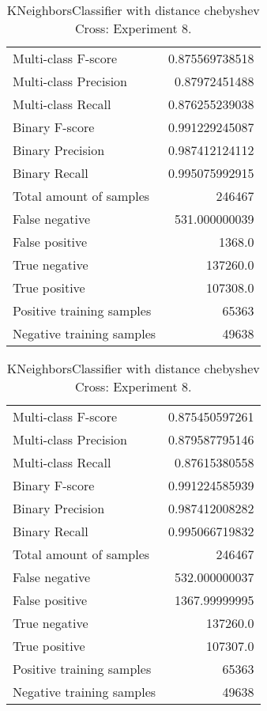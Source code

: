 \begin{table}[H]
\begin{minipage}{0.5\textwidth}
\caption{KNeighborsClassifier with distance chebyshev Cross: Experiment 7.}
\centering
\begin{tabular}{l r}
\toprule
Multi-class F-score & 0.875569738518 \\
Multi-class Precision & 0.87972451488 \\
Multi-class Recall & 0.876255239038 \\
\midrule
Binary F-score & 0.991229245087 \\
Binary Precision & 0.987412124112 \\
Binary Recall & 0.995075992915 \\
\midrule
Total amount of samples & 246467 \\
False negative & 531.000000039 \\
False positive & 1368.0 \\
True negative & 137260.0 \\
True positive & 107308.0 \\
\midrule
Positive training samples & 65363 \\
Negative training samples & 49638 \\
\bottomrule
\end{tabular}
\end{minipage}
\hfillx
\begin{minipage}{0.5\textwidth}
\caption{KNeighborsClassifier with distance chebyshev Cross: Experiment 8.}
\centering
\begin{tabular}{l r}
\toprule
Multi-class F-score & 0.875450597261 \\
Multi-class Precision & 0.879587795146 \\
Multi-class Recall & 0.87615380558 \\
\midrule
Binary F-score & 0.991224585939 \\
Binary Precision & 0.987412008282 \\
Binary Recall & 0.995066719832 \\
\midrule
Total amount of samples & 246467 \\
False negative & 532.000000037 \\
False positive & 1367.99999995 \\
True negative & 137260.0 \\
True positive & 107307.0 \\
\midrule
Positive training samples & 65363 \\
Negative training samples & 49638 \\
\bottomrule
\end{tabular}
\end{minipage}
\end{table}
